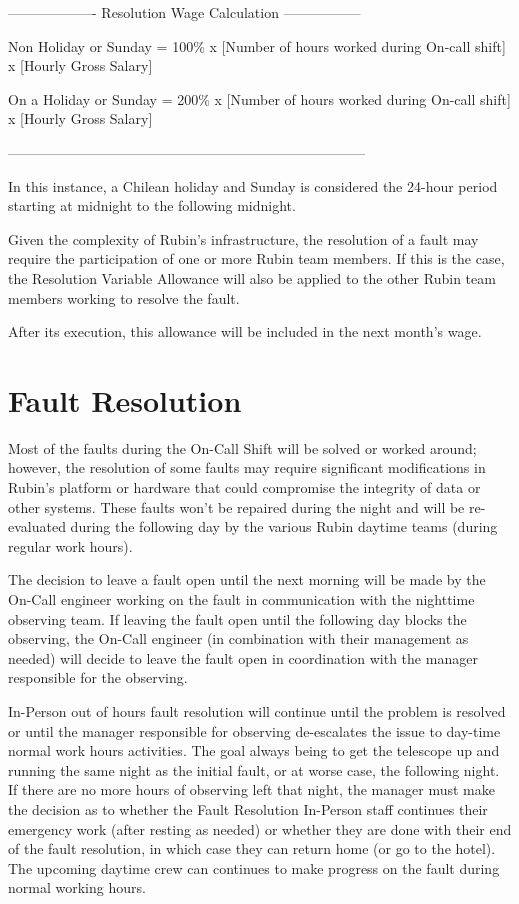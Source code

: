 \begin{center} -------------------  Resolution Wage Calculation ----------------- \end{center}
Non Holiday or Sunday = 100\% x [Number of hours worked during On-call shift] x [Hourly Gross Salary]

\par
On a Holiday or Sunday = 200\% x [Number of hours worked during On-call shift] x [Hourly Gross Salary]
\begin{center} ----------------------------------------------------------------------------- \end{center}


In this instance, a Chilean holiday and Sunday is considered the 24-hour period starting at midnight to the following midnight.

Given the complexity of Rubin's infrastructure, the resolution of a fault may require the participation of one or more Rubin team members. 
If this is the case, the Resolution Variable Allowance will also be applied to the other Rubin team members working to resolve the fault.

After its execution, this allowance will be included in the next month's wage.


\section{Fault Resolution}

Most of the faults during the On-Call Shift will be solved or worked around; however, the resolution of some faults may require significant modifications in Rubin's platform or hardware that could compromise the integrity of data or other systems. 
These faults won't be repaired during the night and will be re-evaluated during the following day by the various Rubin daytime teams (during regular work hours).

The decision to leave a fault open until the next morning will be made by the On-Call engineer working on the fault in communication with the nighttime observing team. 
If leaving the fault open until the following day blocks the observing, the On-Call engineer (in combination with their management as needed) will decide to leave the fault open in coordination with the manager responsible for the observing.

In-Person out of hours fault resolution will continue until the problem is resolved or until the manager responsible for observing de-escalates the issue to day-time normal work hours activities.  
The goal always being to get the telescope up and running the same night as the initial fault, or at worse case, the following night.  
If there are no more hours of observing left that night, the manager must make the decision as to whether the Fault Resolution In-Person staff continues their emergency work (after resting as needed) or whether they are done with their end of the fault resolution, in which case they can return home (or go to the hotel).  
The upcoming daytime crew can continues to make progress on the fault during normal working hours.

